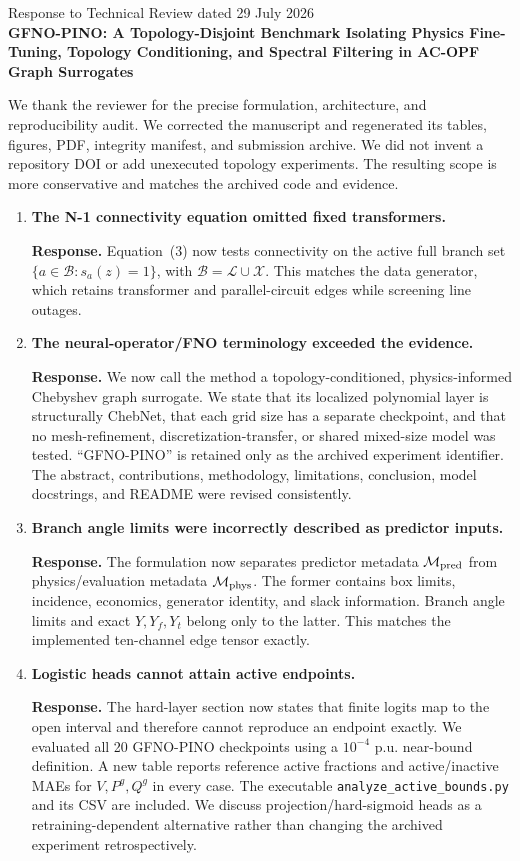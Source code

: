 \documentclass[11pt]{article}
\newcommand{\response}[1]{\par\noindent\textcolor{blue!55!black}{\textbf{Response.} #1}\par}
\begin{document}
\begin{center}
{\Large Response to Technical Review dated 29 July 2026}\\[4pt]
{\bfseries GFNO-PINO: A Topology-Disjoint Benchmark Isolating Physics
Fine-Tuning, Topology Conditioning, and Spectral Filtering in AC-OPF Graph
Surrogates}
\end{center}

We thank the reviewer for the precise formulation, architecture, and
reproducibility audit. We corrected the manuscript and regenerated its tables,
figures, PDF, integrity manifest, and submission archive. We did not invent a
repository DOI or add unexecuted topology experiments. The resulting scope is
more conservative and matches the archived code and evidence.

\begin{enumerate}
\item \textbf{The N-1 connectivity equation omitted fixed transformers.}
\response{Equation~(3) now tests connectivity on the active full branch set
$\{a\in\mathcal B:s_a(z)=1\}$, with
$\mathcal B=\mathcal L\cup\mathcal X$. This matches the data generator, which
retains transformer and parallel-circuit edges while screening line outages.}

\item \textbf{The neural-operator/FNO terminology exceeded the evidence.}
\response{We now call the method a topology-conditioned, physics-informed
Chebyshev graph surrogate. We state that its localized polynomial layer is
structurally ChebNet, that each grid size has a separate checkpoint, and that
no mesh-refinement, discretization-transfer, or shared mixed-size model was
tested. ``GFNO-PINO'' is retained only as the archived experiment identifier.
The abstract, contributions, methodology, limitations, conclusion, model
docstrings, and README were revised consistently.}

\item \textbf{Branch angle limits were incorrectly described as predictor
inputs.}
\response{The formulation now separates predictor metadata
$\mathcal M_{\rm pred}$ from physics/evaluation metadata
$\mathcal M_{\rm phys}$. The former contains box limits, incidence, economics,
generator identity, and slack information. Branch angle limits and exact
$Y,Y_f,Y_t$ belong only to the latter. This matches the implemented
ten-channel edge tensor exactly.}

\item \textbf{Logistic heads cannot attain active endpoints.}
\response{The hard-layer section now states that finite logits map to the open
interval and therefore cannot reproduce an endpoint exactly. We evaluated all
20 GFNO-PINO checkpoints using a $10^{-4}$ p.u. near-bound definition. A new
table reports reference active fractions and active/inactive MAEs for
$V,P^g,Q^g$ in every case. The executable
\texttt{analyze\_active\_bounds.py} and its CSV are included. We discuss
projection/hard-sigmoid heads as a retraining-dependent alternative rather
than changing the archived experiment retrospectively.}


\end{enumerate}
\end{document}
